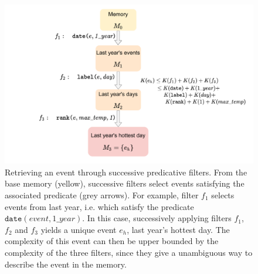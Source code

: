 \documentclass[conference]{IEEEtran}
\begin{document}

\begin{figure}[ht]
  \centering
\includegraphics[width=\linewidth]{figures/filters}
\caption{Retrieving an event through successive predicative
filters. From the base memory (yellow), successive filters select events satisfying the associated predicate (grey arrows). For example,
   filter $f_1$ selects events from last year, i.e. which satisfy the
   predicate $\mathtt{date}(event, 1\_year)$. In this case, successively
   applying filters $f_1$, $f_2$ and $f_3$ yields a unique event $e_h$, last
   year's hottest day. The complexity of this event can then be upper bounded
   by the complexity of the three filters, since they give a unambiguous way
to describe the event in the memory.}
  \label{fig:filters}
\end{figure}
\end{document}
